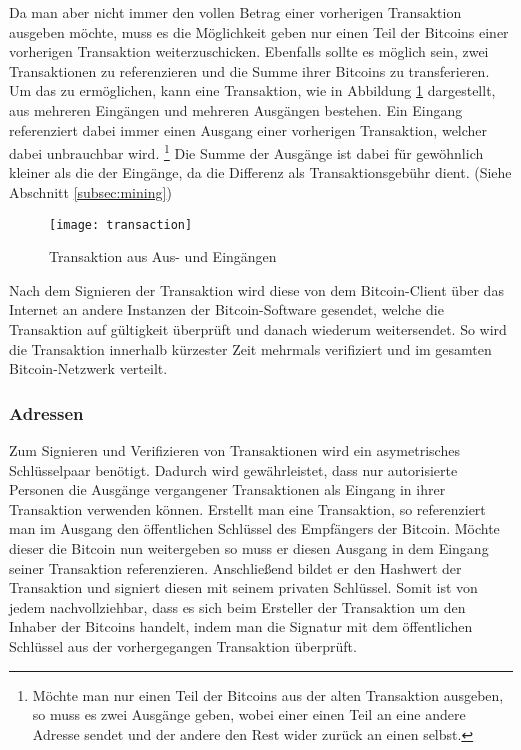 Da man aber nicht immer den vollen Betrag einer vorherigen Transaktion ausgeben möchte, muss es die Möglichkeit geben nur einen Teil der Bitcoins einer vorherigen Transaktion weiterzuschicken.
Ebenfalls sollte es möglich sein, zwei Transaktionen zu referenzieren und die Summe ihrer Bitcoins zu transferieren.
Um das zu ermöglichen, kann eine Transaktion, wie in Abbildung \ref{fig:transaction} dargestellt, aus mehreren Eingängen und mehreren Ausgängen bestehen.
Ein Eingang referenziert dabei immer einen Ausgang einer vorherigen Transaktion, welcher dabei unbrauchbar wird.%
\footnote{Möchte man nur einen Teil der Bitcoins aus der alten Transaktion ausgeben, so muss es zwei Ausgänge geben, wobei einer einen Teil an eine andere Adresse sendet und der andere den Rest wider zurück an einen selbst.}
Die Summe der Ausgänge ist dabei für gewöhnlich kleiner als die der Eingänge, da die Differenz als Transaktionsgebühr dient. (Siehe Abschnitt \ref{subsec:mining})

\begin{figure}[htb]
    \begin{center}
        \texttt{[image: transaction]}
        \caption{Transaktion aus Aus- und Eingängen \parencite[5]{nakamoto}}
        \label{fig:transaction}
    \end{center}
\end{figure}

Nach dem Signieren der Transaktion wird diese von dem Bitcoin-Client über das Internet an andere Instanzen der Bitcoin-Software gesendet, welche die Transaktion auf gültigkeit überprüft und danach wiederum weitersendet.
So wird die Transaktion innerhalb kürzester Zeit mehrmals verifiziert und im gesamten Bitcoin-Netzwerk verteilt.

\subsubsection{Adressen}

Zum Signieren und Verifizieren von Transaktionen wird ein asymetrisches Schlüsselpaar benötigt.
Dadurch wird gewährleistet, dass nur autorisierte Personen die Ausgänge vergangener Transaktionen als Eingang in ihrer Transaktion verwenden können.
Erstellt man eine Transaktion, so referenziert man im Ausgang den öffentlichen Schlüssel des Empfängers der Bitcoin.
Möchte dieser die Bitcoin nun weitergeben so muss er diesen Ausgang in dem Eingang seiner Transaktion referenzieren.
Anschließend bildet er den Hashwert der Transaktion und signiert diesen mit seinem privaten Schlüssel.
Somit ist von jedem nachvollziehbar, dass es sich beim Ersteller der Transaktion um den Inhaber der Bitcoins handelt, indem man die Signatur mit dem öffentlichen Schlüssel aus der vorhergegangen Transaktion überprüft.

